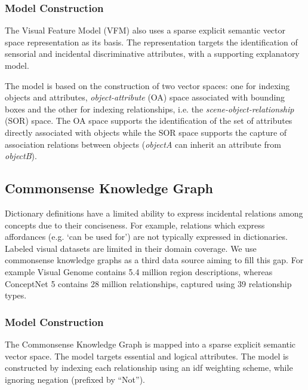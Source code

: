 \documentclass[11pt,a4paper]{article}
\begin{document}
\subsubsection{Model Construction}

The Visual Feature Model (VFM) also uses a sparse explicit semantic vector space representation as its basis. The representation targets the identification of sensorial and incidental discriminative attributes, with a supporting explanatory model. 

The model is based on the construction of two vector spaces: one for indexing objects and attributes, \emph{object-attribute} (OA) space associated with bounding boxes and the other for indexing relationships, i.e. the \emph{scene-object-relationship} (SOR) space. The OA space supports the identification of the set of attributes directly associated with objects while the SOR space supports the capture of association relations between objects (\textit{objectA} can inherit an attribute from \textit{objectB}).









\subsection{Commonsense Knowledge Graph}

Dictionary definitions have a limited ability to express incidental relations among concepts due to their conciseness. For example, relations which express affordances (e.g. `can be used for') are not typically expressed in dictionaries. Labeled visual datasets are limited in their domain coverage. We use commonsense knowledge graphs as a third data source aiming to fill this gap. For example Visual Genome contains 5.4 million region descriptions, whereas ConceptNet 5 contains 28 million relationships, captured using 39 relationship types.



\subsubsection{Model Construction}

The Commonsense Knowledge Graph is mapped into a sparse explicit semantic vector space. The model targets essential and logical attributes. The model is constructed by indexing each relationship using an idf weighting scheme, while ignoring negation (prefixed by “Not”).  
\end{document}

